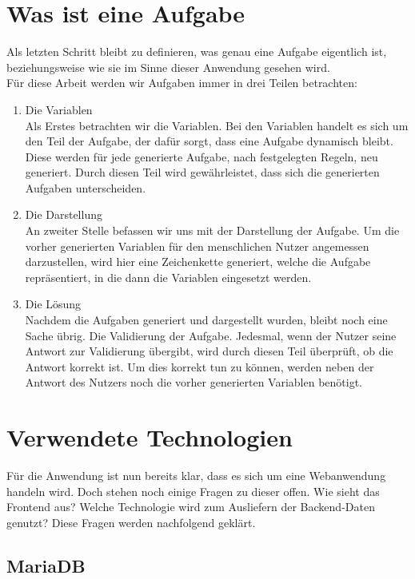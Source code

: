 \section{Was ist eine Aufgabe}

Als letzten Schritt bleibt zu definieren, was genau eine Aufgabe eigentlich ist, beziehungsweise wie sie im Sinne dieser Anwendung gesehen wird. \\
Für diese Arbeit werden wir Aufgaben immer in drei Teilen betrachten:
\begin{enumerate}
\itemsep0em
\item Die Variablen \\
Als Erstes betrachten wir die Variablen. Bei den Variablen handelt es sich um den Teil der Aufgabe, der dafür sorgt, dass eine Aufgabe dynamisch bleibt. Diese werden für jede generierte Aufgabe, nach festgelegten Regeln, neu generiert. Durch diesen Teil wird gewährleistet, dass sich die generierten Aufgaben unterscheiden.
\item Die Darstellung \\
An zweiter Stelle befassen wir uns mit der Darstellung der Aufgabe. Um die vorher generierten Variablen für den menschlichen Nutzer angemessen darzustellen, wird hier eine Zeichenkette generiert, welche die Aufgabe repräsentiert, in die dann die Variablen eingesetzt werden.
\item Die Lösung \\
Nachdem die Aufgaben generiert und dargestellt wurden, bleibt noch eine Sache übrig. Die Validierung der Aufgabe. Jedesmal, wenn der Nutzer seine Antwort zur Validierung übergibt, wird durch diesen Teil überprüft, ob die Antwort korrekt ist. Um dies korrekt tun zu können, werden neben der Antwort des Nutzers noch die vorher generierten Variablen benötigt.
\end{enumerate}

\section{Verwendete Technologien}

Für die Anwendung ist nun bereits klar, dass es sich um eine Webanwendung handeln wird. Doch stehen noch einige Fragen zu dieser offen. Wie sieht das Frontend aus? Welche Technologie wird zum Ausliefern der Backend-Daten genutzt? Diese Fragen werden nachfolgend geklärt.


\subsection{MariaDB}


